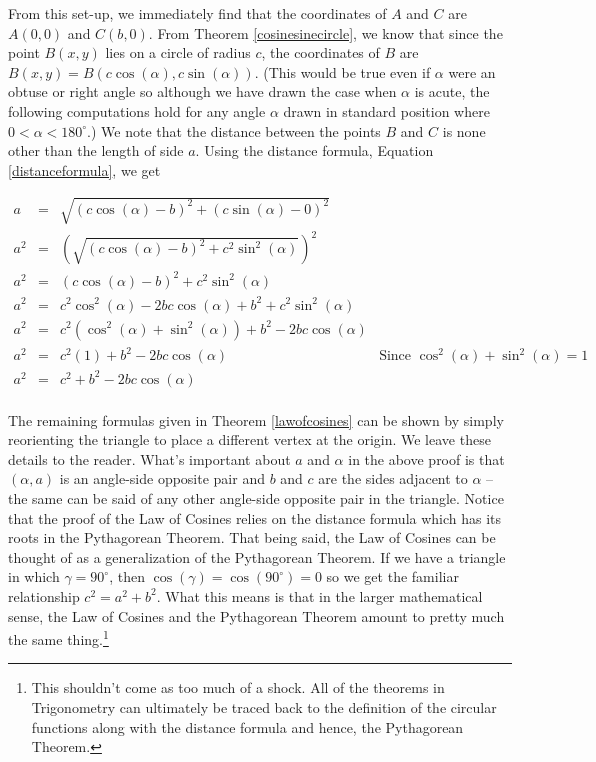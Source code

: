 \medskip

From this set-up, we immediately find that the coordinates of $A$ and $C$ are $A(0,0)$ and $C(b,0)$.  From Theorem \ref{cosinesinecircle}, we know that since the point $B(x,y)$ lies on a circle of radius $c$, the coordinates of $B$ are $B(x,y) = B(c \cos(\alpha), c \sin(\alpha))$.  (This would be true even if $\alpha$ were an obtuse or right angle so although we have drawn the case when $\alpha$ is acute, the following computations hold for any angle $\alpha$ drawn in standard position where $0 < \alpha < 180^{\circ}$.)  We note that the distance between the points $B$ and $C$ is none other than the length of side $a$.  Using the distance formula, Equation \ref{distanceformula}, we get

\[\begin{array}{rclr}
a & = & \sqrt{(c \cos(\alpha) - b)^{2} + (c \sin(\alpha) - 0)^2} & \\ [3pt]
a^{2} & = & \left(\sqrt{(c \cos(\alpha) - b)^{2} + c^2 \sin^2(\alpha)}\right)^2 & \\  [3pt]
a^2 & = &  (c \cos(\alpha) - b)^{2} + c^2 \sin^2(\alpha) & \\  [3pt]
a^2 & = & c^2 \cos^2(\alpha) - 2bc \cos(\alpha) + b^2 + c^2 \sin^2(\alpha) & \\  [3pt]
a^2 & = & c^2\left(\cos^2(\alpha) + \sin^2(\alpha)\right) + b^2 - 2bc \cos(\alpha) & \\  [3pt]
a^2 & = & c^2(1) + b^2 - 2bc \cos(\alpha) & \text{Since $\cos^2(\alpha) + \sin^2(\alpha) = 1$}\\  [3pt]
a^2 & = & c^2 + b^2 - 2bc \cos(\alpha) & \\
\end{array} \]

The remaining formulas given in Theorem \ref{lawofcosines} can be shown by simply reorienting the triangle to place a different vertex at the origin.  We leave these details to the reader.  What's important about $a$ and $\alpha$ in the above proof is that $(\alpha,a)$ is an angle-side opposite pair and $b$ and $c$ are the sides adjacent to $\alpha$ -- the same can be said of any other angle-side opposite pair in the triangle.   Notice that the proof of the Law of Cosines relies on the distance formula which has its roots in the Pythagorean Theorem.  That being said, the Law of Cosines can be thought of as a generalization of the Pythagorean Theorem.  If we have a triangle in which $\gamma = 90^{\circ}$, then $\cos(\gamma) = \cos\left(90^{\circ}\right) = 0$ so we get the familiar relationship  $c^2 = a^2 + b^2$.  What this means is that in the larger mathematical sense, the Law of Cosines and the Pythagorean Theorem amount to pretty much the same thing.\footnote{This shouldn't come as too much of a shock.  All of the theorems in Trigonometry can ultimately be traced back to the definition of the circular functions along with the distance formula and hence, the Pythagorean Theorem.}

